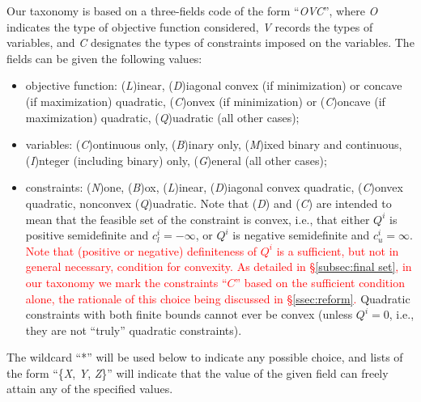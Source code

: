 Our taxonomy is based on a three-fields code of the form ``\textit{OVC}'', where \textit{O} indicates the type of objective function considered, \textit{V} records the types of variables, and \textit{C} designates the types of constraints imposed on the variables. The fields can be given the following values:
%
\begin{itemize}
 \item objective function: (\textit{L})inear, (\textit{D})iagonal convex (if minimization) or concave (if maximization) quadratic, (\textit{C})onvex (if minimization) or (\textit{C})oncave (if maximization) quadratic,  (\textit{Q})uadratic (all other cases);
 \item variables: (\textit{C})ontinuous only, (\textit{B})inary only, (\textit{M})ixed binary and continuous, (\textit{I})nteger (including binary) only, (\textit{G})eneral (all other cases);
 \item constraints: (\textit{N})one, (\textit{B})ox, (\textit{L})inear, (\textit{D})iagonal convex quadratic, (\textit{C})on\-vex quadratic, nonconvex (\textit{Q})uadratic.
  Note that (\textit{D}) and (\textit{C}) are intended to mean that the feasible set of the constraint is convex, i.e., that either $Q^i$ is positive semidefinite and $c_l^i = -\infty$, or $Q^i$ is negative semidefinite and $c_u^i = \infty$. 
    \textcolor{red}{Note that (positive or negative) definiteness of $Q^i$ is a sufficient, but not in general necessary, condition for convexity. As detailed in \S\ref{subsec:final set}, in our taxonomy we mark the constraints ``$C$'' based on the sufficient condition alone, the rationale of this choice being discussed in \S\ref{ssec:reform}.}
  Quadratic constraints with both finite bounds cannot ever be convex (unless $Q^i = 0$, i.e., they are not ``truly'' quadratic constraints).
\end{itemize}
%
The wildcard ``*'' will be used below to indicate any possible choice, and lists of the form ``\{\textit{X}, \textit{Y}, \textit{Z}\}'' will indicate that the value of the given field can freely attain any of the specified values.

